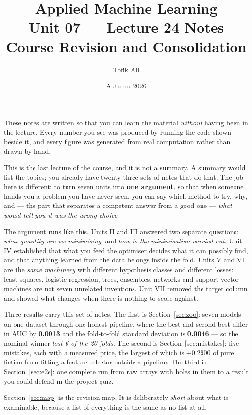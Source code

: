 \documentclass[11pt]{article}
\title{Applied Machine Learning\\Unit 07 --- Lecture 24 Notes\\
       Course Revision and Consolidation}
\author{Tofik Ali}
\date{Autumn 2026}
\begin{document}
\maketitle

\begin{keyidea}
These notes are written so that you can learn the material \emph{without}
having been in the lecture. Every number you see was produced by running the
code shown beside it, and every figure was generated from real computation
rather than drawn by hand.

This is the last lecture of the course, and it is not a summary. A summary
would list the topics; you already have twenty-three sets of notes that do
that. The job here is different: to turn seven units into \textbf{one
argument}, so that when someone hands you a problem you have never seen, you
can say which method to try, why, and --- the part that separates a competent
answer from a good one --- \emph{what would tell you it was the wrong choice}.

The argument runs like this. Units II and III answered two separate questions:
\emph{what quantity are we minimising}, and \emph{how is the minimisation
carried out}. Unit IV established that what you feed the optimiser decides
what it can possibly find, and that anything learned from the data belongs
inside the fold. Units V and VI are the \emph{same machinery} with different
hypothesis classes and different losses: least squares, logistic regression,
trees, ensembles, networks and support vector machines are not seven
unrelated inventions. Unit VII removed the target column and showed what
changes when there is nothing to score against.

Three results carry this set of notes. The first is
Section~\ref{sec:zoo}: seven models on one dataset through one honest
pipeline, where the best and second-best differ in AUC by \textbf{0.0013} and
the fold-to-fold standard deviation is \textbf{0.0046} --- so the nominal
winner \emph{lost 6 of the 20 folds}. The second is Section~\ref{sec:mistakes}:
five mistakes, each with a measured price, the largest of which is
\textbf{$+0.2900$} of pure fiction from fitting a feature selector outside a
pipeline. The third is Section~\ref{sec:e2e}: one complete run from raw arrays
with holes in them to a result you could defend in the project quiz.

Section~\ref{sec:map} is the revision map. It is deliberately \emph{short}
about what is examinable, because a list of everything is the same as no list
at all.
\end{keyidea}
\end{document}
